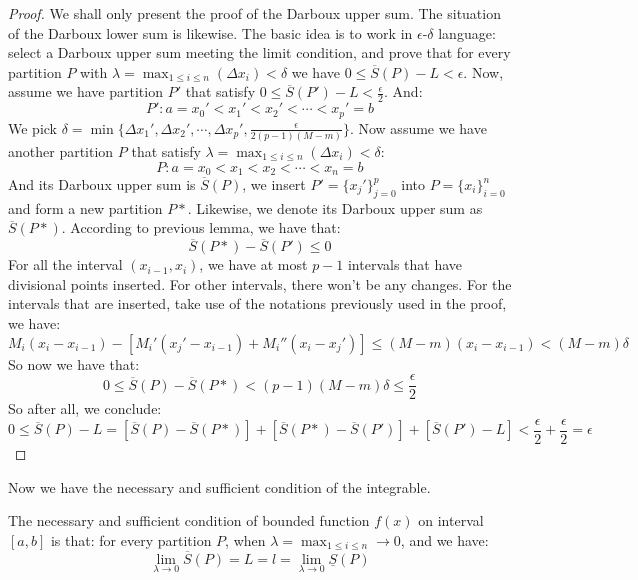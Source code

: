 \begin{proof}
We shall only present the proof of the Darboux upper sum. The situation of the Darboux lower sum is likewise.
The basic idea is to work in $\epsilon$-$\delta$ language: select a Darboux upper sum meeting the limit condition, and prove that for every partition $P$ with $\lambda = \max_{1 \leq i \leq n} (\Delta x_i) < \delta$ we have $0 \leq \overline{S}(P)-L < \epsilon$.
Now, assume we have partition $P'$ that satisfy $0 \leq \overline{S}(P') - L < \frac{\epsilon}{2}$. And:
\[P' : a = x_0' <x_1' < x_2' < \cdots < x_p' = b\]
We pick $\delta = \min \{\Delta x_1', \Delta x_2', \cdots , \Delta x_p', \frac{\epsilon}{2(p-1)(M-m)}\}$.
Now assume we have another partition $P$ that satisfy $\lambda = \max_{1 \leq i \leq n} (\Delta x_i) < \delta$:
\[
P: a = x_0 < x_1 < x_2 < \cdots <x_n = b
\]
And its Darboux upper sum is $\overline{S}(P)$, we insert $P' = \{x_j'\}^p_{j=0}$ into $P = \{x_i\}^n_{i=0}$ and form a new partition $P*$. Likewise, we denote its Darboux upper sum as $\overline{S}(P*)$.
According to previous lemma, we have that:
\[\overline{S}(P*)-\overline{S}(P') \leq 0\]
For all the interval $(x_{i-1},x_i)$, we have at most $p-1$ intervals that have divisional points inserted. For other intervals, there won't be any changes.
For the intervals that are inserted, take use of the notations previously used in the proof, we have:
\[
M_i(x_i-x_{i-1})-[M_i'(x_j'-x_{i-1})+M_i''(x_i-x_j')] \leq (M-m) (x_i-x_{i-1}) < (M-m) \delta
\]
So now we have that:
\[
0 \leq \overline{S}(P)-\overline{S}(P*)<(p-1)(M-m)\delta \leq \frac{\epsilon}{2}
\]
So after all, we conclude:
\[
0 \leq \overline{S}(P)-L = [\overline{S}(P)-\overline{S}(P*)]+[\overline{S}(P*)-\overline{S}(P')]+[\overline{S}(P')-L]<\frac{\epsilon}{2}+\frac{\epsilon}{2}=\epsilon
\]
\end{proof}

Now we have the necessary and sufficient condition of the integrable.

\begin{theorem}
The necessary and sufficient condition of bounded function $f(x)$ on interval $[a,b]$ is that: for every partition $P$, when $\lambda = \max_{1 \leq i \leq n} \to 0$, and we have:
\[
\lim_{\lambda \to 0} \overline{S}(P) = L = l = \lim_{\lambda \to 0} \underline{S}(P)
\]
\end{theorem}

